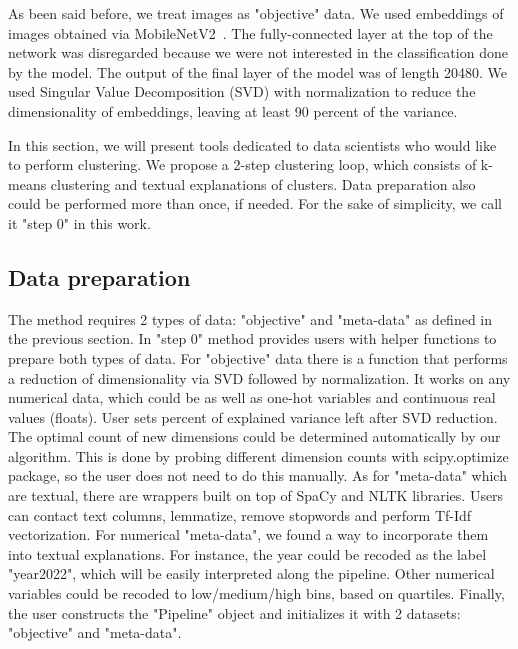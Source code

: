 \documentclass[
 twocolumn,
]{ceurart}
\begin{document}
As been said before, we treat images as "objective" data.
We used embeddings of images obtained via MobileNetV2~\cite{sandler2019mobilenetv2}.
The fully-connected layer at the top of the network was disregarded because we were not interested in the classification done by the model.
The output of the final layer of the model was of length 20480.
We used Singular Value Decomposition (SVD) with normalization to reduce the dimensionality of embeddings, leaving at least 90 percent of the variance.

In this section, we will present tools dedicated to data scientists who would like to perform clustering.
We propose a 2-step clustering loop, which consists of k-means clustering and textual explanations of clusters.
Data preparation also could be performed more than once, if needed.
For the sake of simplicity, we call it "step 0" in this work.

\subsection{Data preparation}
The method requires 2 types of data: "objective" and "meta-data" as defined in the previous section.
In "step 0" method provides users with helper functions to prepare both types of data.
For "objective" data there is a function that performs a reduction of dimensionality via SVD followed by normalization.
It works on any numerical data, which could be as well as one-hot variables and continuous real values (floats).
User sets percent of explained variance left after SVD reduction.
The optimal count of new dimensions could be determined automatically by our algorithm.
This is done by probing different dimension counts with scipy.optimize package, so the user does not need to do this manually.
As for "meta-data" which are textual, there are wrappers built on top of SpaCy and NLTK libraries.
Users can contact text columns, lemmatize, remove stopwords and perform Tf-Idf vectorization.
For numerical "meta-data", we found a way to incorporate them into textual explanations.
For instance, the year could be recoded as the label "year2022", which will be easily interpreted along the pipeline.
Other numerical variables could be recoded to low/medium/high bins, based on quartiles.
Finally, the user constructs the "Pipeline" object and initializes it with 2 datasets: "objective" and "meta-data".
\end{document}
